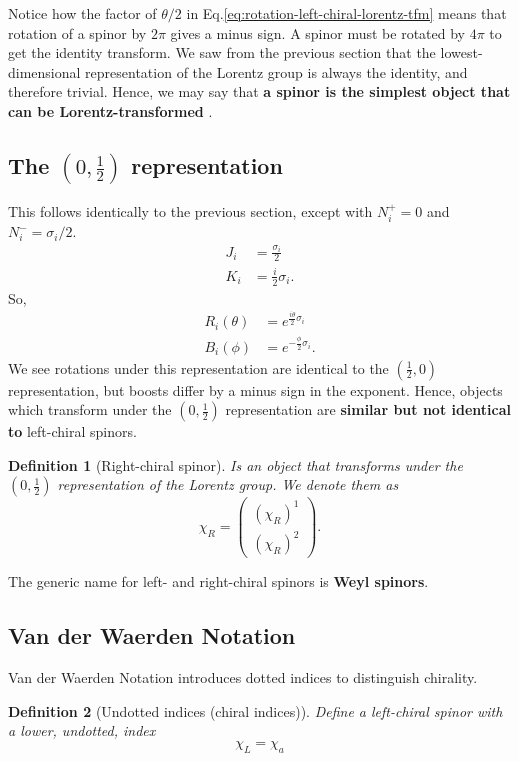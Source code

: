 \documentclass[11pt]{article}
\numberwithin{equation}{section}
\newtheorem{defn}{Definition}[section]
\begin{document}
Notice how the factor of $\theta/2$ in Eq.\eqref{eq:rotation-left-chiral-lorentz-tfm} means that rotation of a spinor by $2\pi$ gives a minus sign. A spinor must be rotated by $4\pi$ to get the identity transform. We saw from the previous section that the lowest-dimensional representation of the Lorentz group is always the identity, and therefore trivial. Hence, we may say that \textbf{a spinor is the simplest object that can be Lorentz-transformed} \citep{Steane13}.

\subsection{The $(0, \frac{1}{2})$ representation}
This follows identically to the previous section, except with $N_i^+=0$ and $N_i^- = \sigma_i/2$. 
\begin{align}
J_i &= \frac{\sigma_i}{2} \\
K_i &= \frac{i}{2} \sigma_i.
\end{align}
So,
\begin{align}
R_i(\theta) &= e^{\frac{i \theta}{2}  \sigma_i} \\
B_i(\phi) &= e^{-\frac{\phi}{2}  \sigma_i}.
\end{align}
We see rotations under this representation are identical to the $(\frac{1}{2},0)$ representation, but boosts differ by a minus sign in the exponent. Hence, objects which transform under the $(0, \frac{1}{2})$ representation are \textbf{similar but not identical to} left-chiral spinors.
\begin{defn}[Right-chiral spinor]
Is an object that transforms under the $(0, \frac{1}{2})$ representation of the Lorentz group. We denote them as 
\begin{equation}
\chi_R = \begin{pmatrix}
(\chi_R)^1 \\
(\chi_R)^2 
\end{pmatrix}.
\end{equation}
\end{defn}
\noindent The generic name for left- and right-chiral spinors is \textbf{Weyl spinors}.

\subsection{Van der Waerden Notation}

Van der Waerden Notation introduces dotted indices to distinguish chirality.

\begin{defn}[Undotted indices (chiral indices)]
Define a left-chiral spinor with a lower, undotted, index
\begin{equation}
\chi_L = \chi_a
\end{equation}
\end{defn}
\end{document}
